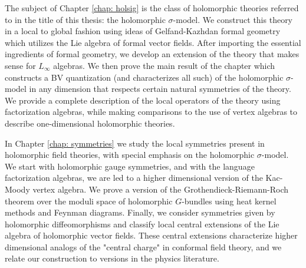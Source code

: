 The subject of Chapter \ref{chap: holsig} is the class of holomorphic theories referred to in the title of this thesis: the holomorphic $\sigma$-model.
We construct this theory in a local to global fashion using ideas of Gelfand-Kazhdan formal geometry which utilizes the Lie algebra of formal vector fields. 
After importing the essential ingredients of formal geometry, we develop an extension of the theory that makes sense for $L_\infty$ algebras.
We then prove the main result of the chapter which constructs a BV quantization (and characterizes all such) of the holomorphic $\sigma$-model in any dimension that respects certain natural symmetries of the theory.
We provide a complete description of the local operators of the theory using factorization algebras, while making comparisons to the use of vertex algebras to describe one-dimensional holomorphic theories. 

In Chapter \ref{chap: symmetries} we study the local symmetries present in holomorphic field theories, with special emphasis on the holomorphic $\sigma$-model.
We start with holomorphic gauge symmetries, and with the language factorization algebras, we are led to a higher dimensional version of the Kac-Moody vertex algebra.
We prove a version of the Grothendieck-Riemann-Roch theorem over the moduli space of holomorphic $G$-bundles using heat kernel methods and Feynman diagrams. 
Finally, we consider symmetries given by holomorphic diffeomorphisms and classify local central extensions of the Lie algebra of holomorphic vector fields. 
These central extensions characterize higher dimensional analogs of the "central charge" in conformal field theory, and we relate our construction to versions in the physics literature. 
